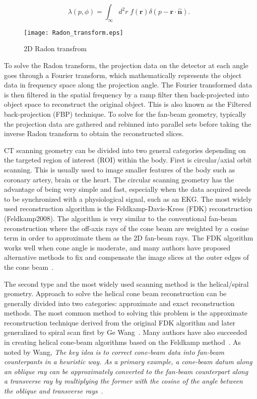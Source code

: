 \begin{equation}
\lambda(p, \phi) = \int_\infty d^2r \; f(\mathbf{r}) \delta(p- \mathbf{r} \cdot \mathbf{\hat{n}}).
\label{eq:radon}
\end{equation}

\begin{figure}[h]
\centering
\texttt{[image: Radon\_transform.eps]}
\caption{2D Radon transfrom }
\label{fig:RadonTransform}
\end{figure}

\noindent To solve the Radon transform, the projection data on the detector at each angle goes through a Fourier transform, which mathematically represents the object data in frequency space along the projection angle.  The Fourier transformed data is then filtered in the spatial frequency by a ramp filter then back-projected into object space to reconstruct the original object.  This is also known as the Filtered back-projection (FBP) technique.  To solve for the fan-beam geometry, typically the projection data are gathered and rebinned into parallel sets before taking the inverse Radon transform to obtain the reconstructed slices.

CT scanning geometry can be divided into two general categories depending on the targeted region of interest (ROI) within the body.  First is circular/axial orbit scanning.  This is usually used to image smaller features of the body such as coronary artery, brain or the heart.  The circular scanning geometry has the advantage of being very simple and fast, especially when the data acquired needs to be synchronized with a physiological signal, such as an EKG.  The most widely used reconstruction algorithm is the Feldkamp-Davis-Kress (FDK) reconstruction (Feldkamp2008).  The algorithm is very similar to the conventional fan-beam reconstruction where the off-axis rays of the cone beam are weighted by a cosine term in order to approximate them as the 2D fan-beam rays.  The FDK algorithm works well when cone angle is moderate, and many authors have proposed alternative methods to fix and compensate the image slices at the outer edges of the cone beam~\citep{Katsevich2003, Chen2003, Hu1996}.

The second type and the most widely used scanning method is the helical/spiral geometry.  Approach to solve the helical cone beam reconstruction can be generally divided into two categories: approximate and exact reconstruction methods.  The most common method to solving this problem is the approximate reconstruction technique derived from the original FDK algorithm and later generalized to spiral scan first by Ge Wang~\citep{Wang1993}.  Many authors have also succeeded in creating helical cone-beam algorithms based on the Feldkamp method~\citep{Wang1992, Kudo1991, Yan1992, Smith1992, Noo1999, Kachelriess2000, Tang2004, Tang2006a, Tang2006b}.  As noted by Wang, \textit{The key idea is to correct cone-beam data into fan-beam counterpants in a heuristic way.  As a primary example, a cone-beam datum along an oblique ray can be approximately converted to the fan-beam counterpart along a transverse ray by multiplying the former with the cosine of the angle between the oblique and transverse rays}~\citep{Wang2007}.

